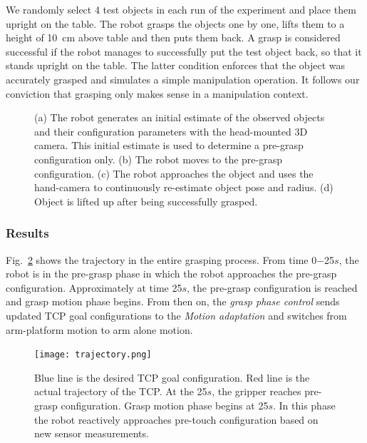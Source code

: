 We randomly select 4 test objects in each run of the experiment and place them upright on the table. The robot grasps the objects one by one, lifts them to a height of 10~cm above table and then puts them back. A grasp is considered successful if the robot manages to successfully put the test object back, so that it stands upright on the table. The latter condition enforces that the object was accurately grasped and simulates a simple manipulation operation. It follows our conviction that grasping only makes sense in a manipulation context.

\begin{figure}[!htbp]
\centering
\def\svgwidth{1\linewidth} 

\captionsetup{justification=raggedright}
\caption{(a) The robot generates an initial estimate of the observed objects and their configuration parameters with the head-mounted 3D camera. This initial estimate is used to determine a pre-grasp configuration only. (b) The robot moves to the pre-grasp configuration. (c) The robot approaches the object and uses the hand-camera to continuously re-estimate object pose and radius. (d) Object is lifted up after being successfully grasped.}
\label{fig:setup}
\end{figure}	
\subsubsection{Results}
Fig.~\ref{fig:trajectory} shows the trajectory in the entire grasping process. From time 0$-$25$s$, the robot is in the pre-grasp phase in which the robot approaches the pre-grasp configuration. Approximately at time 25$s$, the pre-grasp configuration is reached and grasp motion phase begins. From then on, the \textit{grasp phase control} sends updated TCP goal configurations to the \textit{Motion adaptation} and switches from arm-platform motion to arm alone motion.
\begin{figure}[!htbp]
\centering
\texttt{[image: trajectory.png]}
\captionsetup{justification=raggedright}
\caption{Blue line is the desired TCP goal configuration. Red line is the actual trajectory of the TCP. At the 25$s$, the gripper reaches pre-grasp configuration. Grasp motion phase begins at 25$s$. In this phase the robot reactively approaches pre-touch configuration based on new sensor measurements.}
\label{fig:trajectory}       %
\end{figure}  

